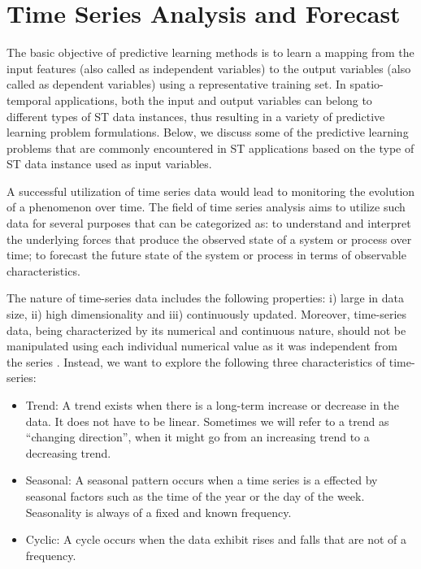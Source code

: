 \section{Time Series Analysis and Forecast}
\label{Sec:TimeSeriesForecast}

The basic objective of predictive learning methods is to learn a mapping from the input features (also called as independent variables) to the output variables (also called as dependent variables) using a representative training set. In spatio-temporal applications, both the input and output variables can belong to different types of ST data instances, thus resulting in a variety of predictive learning problem formulations. Below, we discuss some of the predictive learning problems that are commonly encountered in ST applications based on the type of ST data instance used as input variables.

A successful utilization of time series data would lead to monitoring the evolution of a phenomenon over time. The field of time series analysis aims to utilize such data for several purposes that can be categorized as: to understand and interpret the underlying forces that produce the observed state of a system or process over time; to forecast the future state of the system or process in terms of observable characteristics.

The nature of time-series data includes the following properties: i) large in data size, ii) high dimensionality and iii) continuously updated. Moreover, time-series data, being characterized by its numerical and continuous nature, should not be manipulated using each individual numerical value as it was independent from the series \cite{Pal2017}. Instead, we want to explore the following three characteristics of time-series:

\begin{itemize}
	\item Trend: A trend exists when there is a long-term increase or decrease in the data. It does not have to be linear. Sometimes we will refer to a trend as ``changing direction'', when it might go from an increasing trend to a decreasing trend.
	\item Seasonal: A seasonal pattern occurs when a time series is a effected by seasonal factors such as the time of the year or the day of the week. Seasonality is always of a fixed and known frequency. 
	\item Cyclic: A cycle occurs when the data exhibit rises and falls that are not of a frequency.
\end{itemize}

